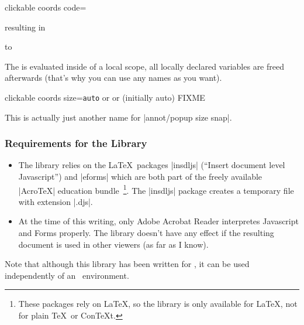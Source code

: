 \begin{pgfplotskey}{clickable coords code=}
{\begin{codeexample}[]
\begin{tikzpicture}
\begin{loglogaxis}
\end{loglogaxis}
\end{tikzpicture}
\end{codeexample}
	\noindent resulting in

	\noindent\hbox to %
}

	The  is evaluated inside of a local scope, all locally declared variables are freed afterwards (that's why you can use any names as you want).
\end{pgfplotskey}

\begin{pgfplotskey}{clickable coords size=\texttt{auto} or  or  (initially auto)}
	FIXME

	This is actually just another name for |annot/popup size snap|.
\end{pgfplotskey}

\subsubsection{Requirements for the Library}
	\begin{itemize}
		\item The library relies on the \LaTeX\ packages |insdljs| (``Insert document level Javascript'') and |eforms| which are both part of the freely available |AcroTeX| education bundle~\cite{acrotex}\footnote{These packages rely on \LaTeX, so the library is only available for \LaTeX, not for plain \TeX\ or Con\TeX t.}. The |insdljs| package creates a temporary file with extension |.djs|.
		
		\item At the time of this writing, only Adobe Acrobat Reader interpretes Javascript and Forms properly. The library doesn't have any effect if the resulting document is used in other viewers (as far as I know).

	\end{itemize}
	Note that although this library has been written for \PGFPlots, it can be used independently of an \PGFPlots\ environment.

